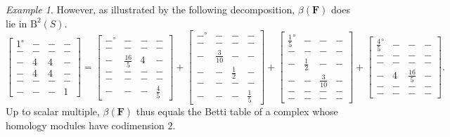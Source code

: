 \documentclass[12pt]{amsart}
\theoremstyle{definition}
\theoremstyle{remark}
\newtheorem{example}[lemma]{Example}
\newcommand{\FF}{\mathbf{F}}
\newcommand{\zp}{\circ}
\newcommand{\BBQ}{\mathrm{B}}
\begin{document}
\begin{example}
However, as illustrated by the following decomposition, $\beta(\FF)$ does lie in $\BBQ^2(S)$.
\[
\begin{bmatrix} 1^\zp&-&-&-\\ -&-&-&-\\-&4&4&-\\-&4&4&-\\-&-&-&-\\-&-&-&1 \end{bmatrix}
=
\begin{bmatrix} -^\zp&-&-&-\\ -&-&-&-\\-&\frac{16}{5}&4&-\\-&-&-&-\\-&-&-&-\\-&-&-&\frac{4}{5} \end{bmatrix}
+
\begin{bmatrix} -^\zp&-&-&-\\ -&-&-&-\\-&\frac{3}{10}&-&-\\-&-&\frac{1}{2}&-\\-&-&-&-\\-&-&-&\frac{1}{5} \end{bmatrix}
+
\begin{bmatrix} \frac{1}{5}^\zp&-&-&-\\ -&-&-&-\\-&\frac{1}{2}&-&-\\-&-&\frac{3}{10}&-\\-&-&-&-\\-&-&-&- \end{bmatrix}
+
\begin{bmatrix} \frac{4}{5}^\zp&-&-&-\\ -&-&-&-\\-&-&-&-\\-&4&\frac{16}{5}&-\\-&-&-&-\\-&-&-&- \end{bmatrix}.
\]
Up to scalar multiple, $\beta(\FF)$ thus equals the Betti table of a complex whose homology modules have codimension $2$.
\end{example}
\end{document}
